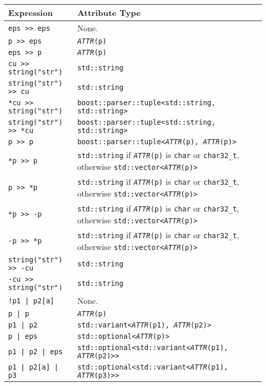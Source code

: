 \begin{longtable}[]{@{}ll@{}}
\toprule\noalign{}
Expression & Attribute Type \\
\midrule\noalign{}
\endhead
\bottomrule\noalign{}
\endlastfoot
\texttt{eps >> eps} & None. \\
\texttt{p >> eps} & \emph{\texttt{ATTR}}\texttt{(p)} \\
\texttt{eps >> p} & \emph{\texttt{ATTR}}\texttt{(p)} \\
\texttt{cu >> string("str")} & \texttt{std::string} \\
\texttt{string("str") >> cu} & \texttt{std::string} \\
\texttt{*cu >> string("str")} & \texttt{boost::parser::tuple<std::string, std::string>} \\
\texttt{string("str") >> *cu} & \texttt{boost::parser::tuple<std::string, std::string>} \\
\texttt{p >> p} & \texttt{boost::parser::tuple<}\emph{\texttt{ATTR}}\texttt{(p), }\emph{\texttt{ATTR}}\texttt{(p)>} \\
\texttt{*p >> p} & \texttt{std::string} if \emph{\texttt{ATTR}}\texttt{(p)} is \texttt{char} or \texttt{char32\_t}, otherwise \texttt{std::vector<}\emph{\texttt{ATTR}}\texttt{(p)>} \\
\texttt{p >> *p} & \texttt{std::string} if \emph{\texttt{ATTR}}\texttt{(p)} is \texttt{char} or \texttt{char32\_t}, otherwise \texttt{std::vector<}\emph{\texttt{ATTR}}\texttt{(p)>} \\
\texttt{*p >> -p} & \texttt{std::string} if \emph{\texttt{ATTR}}\texttt{(p)} is \texttt{char} or \texttt{char32\_t}, otherwise \texttt{std::vector<}\emph{\texttt{ATTR}}\texttt{(p)>} \\
\texttt{-p >> *p} & \texttt{std::string} if \emph{\texttt{ATTR}}\texttt{(p)} is \texttt{char} or \texttt{char32\_t}, otherwise \texttt{std::vector<}\emph{\texttt{ATTR}}\texttt{(p)>} \\
\texttt{string("str") >> -cu} & \texttt{std::string} \\
\texttt{-cu >> string("str")} & \texttt{std::string} \\
\texttt{!p1 | p2{[}a{]}} & None. \\
\texttt{p | p} & \emph{\texttt{ATTR}}\texttt{(p)} \\
\texttt{p1 | p2} & \texttt{std::variant<}\emph{\texttt{ATTR}}\texttt{(p1), }\emph{\texttt{ATTR}}\texttt{(p2)>} \\
\texttt{p | }\texttt{eps} & \texttt{std::optional<}\emph{\texttt{ATTR}}\texttt{(p)>} \\
\texttt{p1 | p2 | eps} & \texttt{std::optional<std::variant<}\emph{\texttt{ATTR}}\texttt{(p1), }\emph{\texttt{ATTR}}\texttt{(p2)>>} \\
\texttt{p1 | p2{[}a{]} | p3} & \texttt{std::optional<std::variant<}\emph{\texttt{ATTR}}\texttt{(p1), }\emph{\texttt{ATTR}}\texttt{(p3)>>} \\
\end{longtable}

